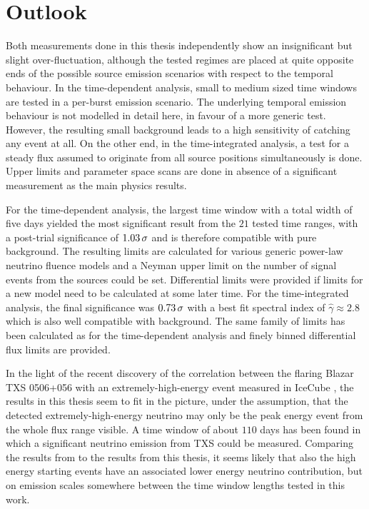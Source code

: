 \chapter{Outlook}

Both measurements done in this thesis independently show an insignificant but slight over-fluctuation, although the tested regimes are placed at quite opposite ends of the possible source emission scenarios with respect to the temporal behaviour.
In the time-dependent analysis, small to medium sized time windows are tested in a per-burst emission scenario.
The underlying temporal emission behaviour is not modelled in detail here, in favour of a more generic test.
However, the resulting small background leads to a high sensitivity of catching any event at all.
On the other end, in the time-integrated analysis, a test for a steady flux assumed to originate from all source positions simultaneously is done.
Upper limits and parameter space scans are done in absence of a significant measurement as the main physics results.

For the time-dependent analysis, the largest time window with a total width of five days yielded the most significant result from the $\num{21}$ tested time ranges, with a post-trial significance of $\num{1.03}\,\sigma$ and is therefore compatible with pure background.
The resulting limits are calculated for various generic power-law neutrino fluence models and a Neyman upper limit on the number of signal events from the sources could be set.
Differential limits were provided if limits for a new model need to be calculated at some later time.
For the time-integrated analysis, the final significance was $\num{0.73}\,\sigma$ with a best fit spectral index of $\hat{\gamma} \approx 2.8$ which is also well compatible with background.
The same family of limits has been calculated as for the time-dependent analysis and finely binned differential flux limits are provided.

In the light of the recent discovery of the correlation between the flaring Blazar TXS 0506+056 with an extremely-high-energy event measured in IceCube \cite{IceCube:2018dnn}, the results in this thesis seem to fit in the picture, under the assumption, that the detected extremely-high-energy neutrino may only be the peak energy event from the whole flux range visible.
A time window of about $\num{110}$ days has been found in which a significant neutrino emission from TXS could be measured.
Comparing the results from \cite{IceCube:2018cha,IceCube:2018dnn} to the results from this thesis, it seems likely that also the high energy starting events have an associated lower energy neutrino contribution, but on emission scales somewhere between the time window lengths tested in this work.

